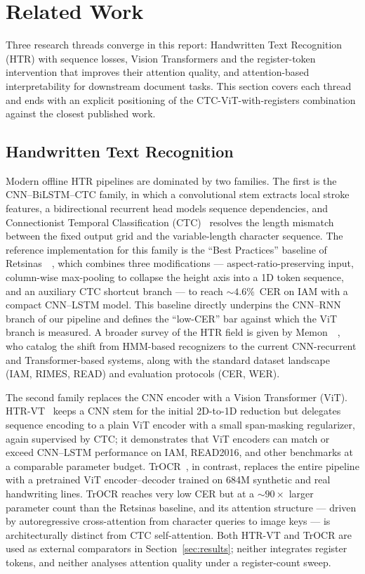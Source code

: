 \section{Related Work}
\label{sec:related_work}

Three research threads converge in this report: Handwritten Text Recognition (HTR) with sequence losses, Vision Transformers and the register-token intervention that improves their attention quality, and attention-based interpretability for downstream document tasks. This section covers each thread and ends with an explicit positioning of the CTC-ViT-with-registers combination against the closest published work.

\subsection{Handwritten Text Recognition}
\label{sec:rw_htr}

Modern offline HTR pipelines are dominated by two families. The first is the CNN--BiLSTM--CTC family, in which a convolutional stem extracts local stroke features, a bidirectional recurrent head models sequence dependencies, and Connectionist Temporal Classification (CTC)~\cite{graves2006ctc} resolves the length mismatch between the fixed output grid and the variable-length character sequence. The reference implementation for this family is the ``Best Practices'' baseline of Retsinas~\etal~\cite{retsinas2022htrbestpractices}, which combines three modifications --- aspect-ratio-preserving input, column-wise max-pooling to collapse the height axis into a 1D token sequence, and an auxiliary CTC shortcut branch --- to reach ${\sim}4.6\%$~CER on IAM with a compact CNN--LSTM model. This baseline directly underpins the CNN--RNN branch of our pipeline and defines the ``low-CER'' bar against which the ViT branch is measured. A broader survey of the HTR field is given by Memon~\etal~\cite{memon2020htrsurvey}, who catalog the shift from HMM-based recognizers to the current CNN-recurrent and Transformer-based systems, along with the standard dataset landscape (IAM, RIMES, READ) and evaluation protocols (CER, WER).

The second family replaces the CNN encoder with a Vision Transformer (ViT). HTR-VT~\cite{li2024htrvt} keeps a CNN stem for the initial 2D-to-1D reduction but delegates sequence encoding to a plain ViT encoder with a small span-masking regularizer, again supervised by CTC; it demonstrates that ViT encoders can match or exceed CNN--LSTM performance on IAM, READ2016, and other benchmarks at a comparable parameter budget. TrOCR~\cite{li2023trocr}, in contrast, replaces the entire pipeline with a pretrained ViT encoder--decoder trained on 684M synthetic and real handwriting lines. TrOCR reaches very low CER but at a ${\sim}90\times$ larger parameter count than the Retsinas baseline, and its attention structure --- driven by autoregressive cross-attention from character queries to image keys --- is architecturally distinct from CTC self-attention. Both HTR-VT and TrOCR are used as external comparators in Section~\ref{sec:results}; neither integrates register tokens, and neither analyses attention quality under a register-count sweep.

